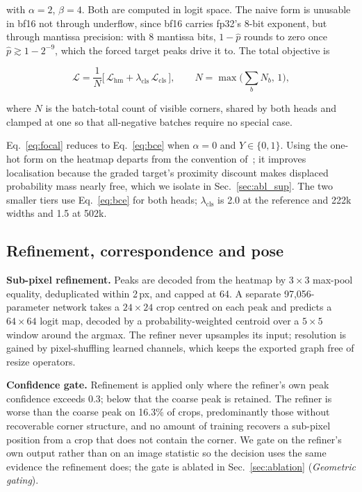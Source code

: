 \documentclass[10pt,twocolumn,letterpaper]{article}
\begin{document}
with $\alpha = 2$, $\beta = 4$. Both are computed in logit space. The naive form is unusable in
bf16 not through underflow, since bf16 carries fp32's 8-bit exponent, but through mantissa
precision: with 8 mantissa bits, $1 - \hat p$ rounds to zero once $\hat p \gtrsim 1 - 2^{-9}$,
which the forced target peaks drive it to. The total objective is

\begin{equation}
\mathcal{L} = \frac{1}{N}\Big[\, \mathcal{L}_{\mathrm{hm}}
+ \lambda_{\mathrm{cls}}\,\mathcal{L}_{\mathrm{cls}} \,\Big],
\qquad N = \max\!\Big(\textstyle\sum_b N_b,\, 1\Big),
\label{eq:total}
\end{equation}

where $N$ is the batch-total count of visible corners, shared by both heads and clamped at one so
that all-negative batches require no special case.

Eq.~\ref{eq:focal} reduces to Eq.~\ref{eq:bce} when $\alpha=0$ and $Y\in\{0,1\}$. Using the
one-hot form on the heatmap departs from the convention of~\cite{cornernet,centernet}; it improves
localisation because the graded target's proximity discount makes displaced probability mass nearly
free, which we isolate in Sec.~\ref{sec:abl_sup}. The two smaller tiers use Eq.~\ref{eq:bce} for
both heads; $\lambda_{\mathrm{cls}}$ is 2.0 at the reference and 222k widths and 1.5 at 502k.

\subsection{Refinement, correspondence and pose}
\label{sec:geom}

\textbf{Sub-pixel refinement.} Peaks are decoded from the heatmap by $3\times3$ max-pool equality,
deduplicated within 2\,px, and capped at 64. A separate 97,056-parameter network takes a
$24\times24$ crop centred on each peak and predicts a $64\times64$ logit map, decoded by a
probability-weighted centroid over a $5\times5$ window around the argmax. The refiner never
upsamples its input; resolution is gained by pixel-shuffling learned channels, which keeps the
exported graph free of resize operators.

\textbf{Confidence gate.} Refinement is applied only where the refiner's own peak confidence
exceeds 0.3; below that the coarse peak is retained. The refiner is worse than the coarse peak on
16.3\% of crops, predominantly those without recoverable corner structure, and no amount of
training recovers a sub-pixel position from a crop that does not contain the corner. We gate on
the refiner's own output rather than on an image statistic so the decision uses the same evidence
the refinement does; the gate is ablated in Sec.~\ref{sec:ablation} (\emph{Geometric gating}).
\end{document}
